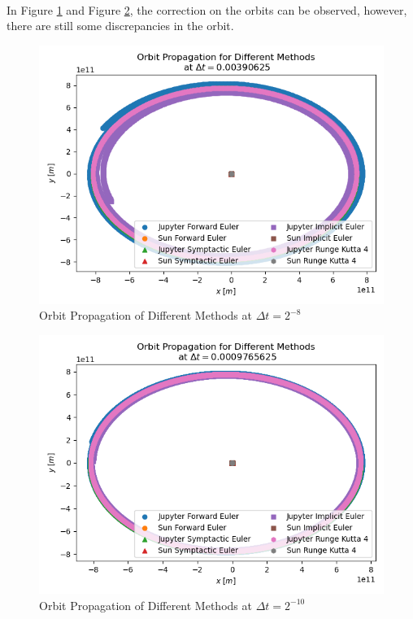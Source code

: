 \documentclass[letterpaper,12pt]{article}
\begin{document}
\paragraph{} In Figure \ref{fig:11} and Figure \ref{fig:12}, the correction on the orbits can be observed, however, there are still some discrepancies in the orbit.
    \begin{figure}[H]
    \centerline{\includegraphics[width=0.7\linewidth]{figures/11.png}}
    \caption{Orbit Propagation of Different Methods at $\Delta t = 2^{-8}$}
    \label{fig:11}
    \end{figure}
    \begin{figure}[H]
    \centerline{\includegraphics[width=0.7\linewidth]{figures/12.png}}
    \caption{Orbit Propagation of Different Methods at $\Delta t = 2^{-10}$}
    \label{fig:12}
    \end{figure}
\end{document}
